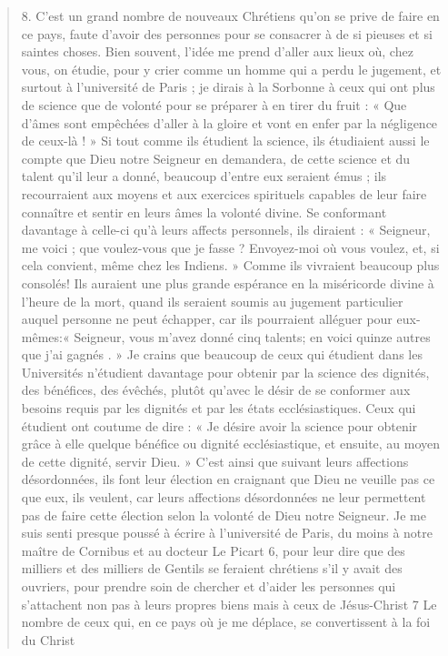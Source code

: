 \begin{quote}
8. C'est un grand nombre de nouveaux Chrétiens qu'on se prive
de faire en ce pays, faute d'avoir des personnes pour se consacrer
à de si pieuses et si saintes choses. Bien souvent, l'idée me prend
d'aller aux lieux où, chez vous, on étudie, pour y crier comme un
homme qui a perdu le jugement, et surtout à l'université de Paris ;
je dirais à la Sorbonne à ceux qui ont plus de science que de
volonté pour se préparer à en tirer du fruit : « Que d'âmes sont
empêchées d'aller à la gloire et vont en enfer par la négligence de
ceux-là ! » Si tout comme ils étudient la science, ils étudiaient aussi
le compte que Dieu notre Seigneur en demandera, de cette science
et du talent qu'il leur a donné, beaucoup d'entre eux seraient
émus ; ils recourraient aux moyens et aux exercices spirituels capables
de leur faire connaître et sentir en leurs âmes la volonté divine.
Se conformant davantage à celle-ci qu'à leurs affects personnels,
ils diraient : « Seigneur, me voici ; que voulez-vous que je fasse ?
Envoyez-moi où vous voulez, et, si cela convient, même chez les
Indiens. » Comme ils vivraient beaucoup plus consolés! Ils
auraient une plus grande espérance en la miséricorde divine à
     l'heure de la mort, quand ils seraient soumis au jugement particulier
auquel personne ne peut échapper, car ils pourraient alléguer
pour eux-mêmes:« Seigneur, vous m'avez donné cinq talents; en
voici quinze autres que j'ai gagnés . » Je crains que beaucoup de
ceux qui étudient dans les Universités n'étudient davantage pour
obtenir par la science des dignités, des bénéfices, des évêchés, plutôt
qu'avec le désir de se conformer aux besoins requis par les dignités
et par les états ecclésiastiques. Ceux qui étudient ont coutume
de dire : « Je désire avoir la science pour obtenir grâce à elle quelque
bénéfice ou dignité ecclésiastique, et ensuite, au moyen de cette
dignité, servir Dieu. » C'est ainsi que suivant leurs affections désordonnées,
ils font leur élection en craignant que Dieu ne veuille pas
ce que eux, ils veulent, car leurs affections désordonnées ne leur
permettent pas de faire cette élection selon la volonté de Dieu notre
Seigneur. Je me suis senti presque poussé à écrire à l'université de
Paris, du moins à notre maître de Cornibus et au docteur Le
Picart 6, pour leur dire que des milliers et des milliers de Gentils
se feraient chrétiens s'il y avait des ouvriers, pour prendre soin de
chercher et d'aider les personnes qui s'attachent non pas à leurs
propres biens mais à ceux de Jésus-Christ 7 Le nombre de ceux
qui, en ce pays où je me déplace, se convertissent à la foi du Christ

\end{quote}
